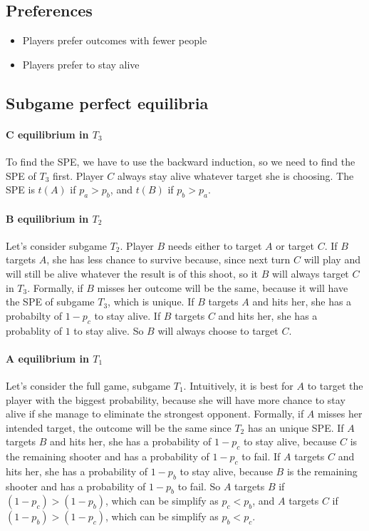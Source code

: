 \documentclass[letterpaper]{article}
\begin{document}
\subsection{Preferences}
\begin{itemize}
    \item Players prefer outcomes with fewer people
    \item Players prefer to stay alive
\end{itemize}


\subsection{Subgame perfect equilibria}

\paragraph{C equilibrium in $T_3$}

To find the SPE, we have to use the backward induction, so we need to find
the SPE of $T_3$ first. Player $C$ always stay alive whatever target she is
choosing. The SPE is $t(A)$ if $p_a > p_b$, and $t(B)$ if $p_b > p_a$.

\paragraph{B equilibrium in $T_2$}

Let's consider subgame $T_2$. Player $B$ needs either to target $A$
or target $C$. If $B$ targets $A$, she has less chance to survive because,
since next turn $C$ will play and will still be alive whatever the result is
of this shoot, so it $B$ will always target $C$ in $T_3$.
Formally, if $B$ misses her outcome will be the same, because it will have
the SPE of subgame $T_3$, which is unique.
If $B$ targets $A$ and hits her, she has
a probabilty of $1 - p_c$ to stay alive. If $B$ targets $C$ and hits her, she
has a probablity of $1$ to stay alive. So $B$ will always choose to target $C$.

\paragraph{A equilibrium in $T_1$}

Let's consider the full game, subgame $T_1$. Intuitively, it is best for
$A$ to target the player with the biggest probability, because she will have
more chance to stay alive if she manage to eliminate the strongest opponent.
Formally, if $A$ misses her intended target, the outcome will be the same
since $T_2$ has an unique SPE. If $A$ targets $B$ and hits her, she has
a probability of $1 - p_c$ to stay alive, because $C$ is
the remaining shooter and has a probability of $1 - p_c$ to fail.
If $A$ targets $C$ and hits her,
she has a probability of $1 - p_b$ to stay alive, because $B$ is
the remaining shooter and has a probability of $1 - p_b$ to fail.
So $A$ targets $B$ if
$ (1 - p_c) > (1 - p_b)$, which can be simplify as
$p_c < p_b$, and $A$ targets $C$
if $(1 - p_b) > (1 - p_c)$, which can be simplify as $p_b < p_c$.
\end{document}
